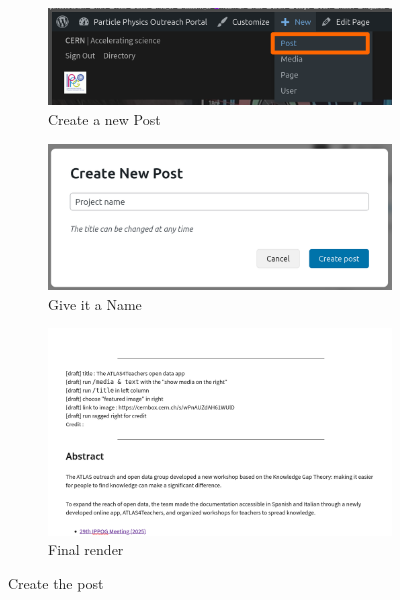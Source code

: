 \begin{figure}[h!]
    \centering
    \begin{subfigure}[b]{\textwidth}
        \centering
        \includegraphics[width=.7\textwidth]{Image/Process/post.png}
        \caption{Create a new Post}
        \label{fig:post}
    \end{subfigure}
    \bigskip
    \begin{subfigure}[b]{\textwidth}
        \centering
        \includegraphics[width=.7\linewidth]{Image/Process/Name.png}
        \caption{Give it a Name}
        \label{fig:name}
    \end{subfigure}
    \bigskip
    \begin{subfigure}[b]{\textwidth}
        \centering
        \includegraphics[width=.7\linewidth]{Image/Process/upload.png}
        \caption{Final render}
        \label{fig:first_upload}
    \end{subfigure}
    \caption{Create the post}
\end{figure}

\newpage
